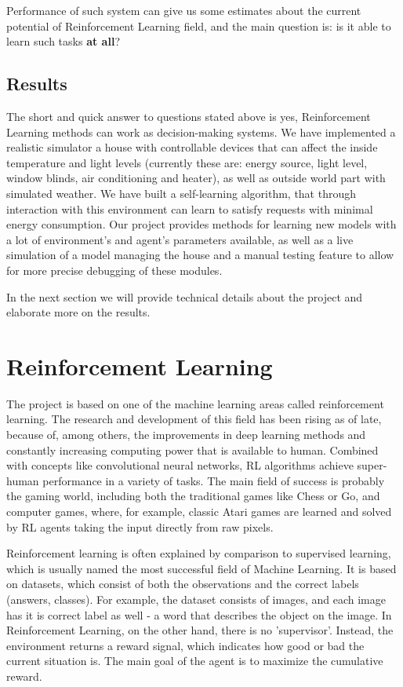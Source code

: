 \documentclass{article}
\begin{document}
Performance of such system can give us some estimates about the current potential of Reinforcement Learning field, and the main question is: is it able to learn such tasks \textbf{at all}?

\subsection{Results}
The short and quick answer to questions stated above is yes, Reinforcement Learning methods can work as decision-making systems. We have implemented a realistic simulator a house with controllable devices that can affect the inside temperature and light levels (currently these are: energy source, light level, window blinds, air conditioning and heater), as well as outside world part with simulated weather. We have built a self-learning algorithm, that through interaction with this environment can learn to satisfy requests with minimal energy consumption. Our project provides methods for learning new models with a lot of environment's and agent's parameters available, as well as a live simulation of a model managing the house and a manual testing feature to allow for more precise debugging of these modules.

In the next section we will provide technical details about the project and elaborate more on the results.

\section{Reinforcement Learning}
The project is based on one of the machine learning areas called reinforcement learning. The research and development of this field has been rising as of late, because of, among others, the improvements in deep learning methods and constantly increasing computing power that is available to human. Combined with concepts like convolutional neural networks, RL algorithms achieve super-human performance in a variety of tasks. The main field of success is probably the gaming world, including both the traditional games like Chess or Go, and computer games, where, for example, classic Atari games are learned and solved by RL agents taking the input directly from raw pixels.

Reinforcement learning is often explained by comparison to supervised learning, which is usually named the most successful field of Machine Learning. It is based on datasets, which consist of both the observations and the correct labels (answers, classes). For example, the dataset consists of images, and each image has it is correct label as well - a word that describes the object on the image. In Reinforcement Learning, on the other hand, there is no 'supervisor'. Instead, the environment returns a reward signal, which indicates how good or bad the current situation is. The main goal of the agent is to maximize the cumulative reward.
\end{document}
